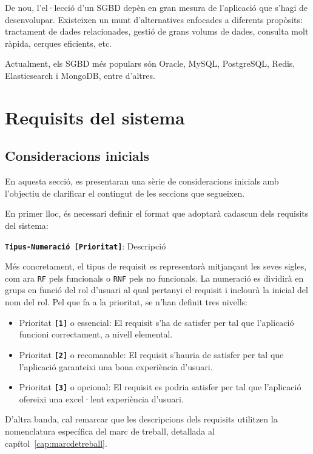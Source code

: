 \documentclass[a4paper,12pt]{ThesisStyle}
\begin{document}
De nou, l'el·lecció d'un SGBD depèn en gran mesura de l'aplicació que s'hagi de desenvolupar. Existeixen un munt d'alternatives enfocades a diferents propòsits: tractament de dades relacionades, gestió de grans volums de dades, consulta molt ràpida, cerques eficients, etc.

Actualment, els SGBD més populars són Oracle, MySQL, PostgreSQL, Redis, Elasticsearch i MongoDB, entre d'altres.


\chapter{Requisits del sistema}
\label{cap:requisits}

\section{Consideracions inicials}
\label{sec:consideracions_inicials}

En aquesta secció, es presentaran una sèrie de consideracions inicials amb l'objectiu de clarificar el contingut de les seccions que segueixen.

En primer lloc, és necessari definir el format que adoptarà cadascun dels requisits del sistema:
\\[8pt]
\centerline{\texttt{\textbf{Tipus-Numeració [Prioritat]}}: Descripció}

Més concretament, el tipus de requisit es representarà mitjançant les seves sigles, com ara \texttt{RF} pels funcionals o \texttt{RNF} pels no funcionals. La numeració es dividirà en grups en funció del rol d'usuari al qual pertanyi el requisit i inclourà la inicial del nom del rol. Pel que fa a la prioritat, se n'han definit tres nivells:
\begin{itemize}
  \item Prioritat \texttt{\textbf{[1]}} o essencial: El requisit s'ha de satisfer per tal que l'aplicació funcioni correctament, a nivell elemental.
  \item Prioritat \texttt{\textbf{[2]}} o recomanable: El requisit s'hauria de satisfer per tal que l'aplicació garanteixi una bona experiència d'usuari.
  \item Prioritat \texttt{\textbf{[3]}} o opcional: El requisit es podria satisfer per tal que l'aplicació ofereixi una excel·lent experiència d'usuari.
\end{itemize}

D'altra banda, cal remarcar que les descripcions dels requisits utilitzen la nomenclatura específica del marc de treball, detallada al capítol~\ref{cap:marcdetreball}.
\end{document}
